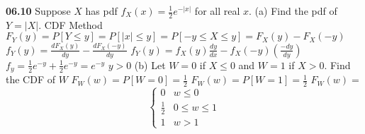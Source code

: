 {\bf 06.10}
Suppose $X$ has pdf $f_X(x)=\frac{1}{2}e^{-\left|x\right|}$ for all real $x$.
\newline
\newline (a) Find the pdf of $Y = \left|X\right|$.
\newline CDF Method
\newline $F_Y(y) = P[Y \leq y] = P[\left|x\right| \leq y] = P[-y \leq X \leq y] = F_X(y)-F_X(-y)$
\newline $f_Y(y) = \frac{dF_X(y)}{dy} - \frac{dF_X(-y)}{dy}$
\newline $f_Y(y) = f_X(y)\frac{dy}{dx} - f_X(-y)(\frac{-dy}{dy})$
\newline $f_y = \frac{1}{2}e^{-y} + \frac{1}{2}e^{-y} = e^{-y}$ $y>0$
\newline
\newline (b) Let $W = 0$ if $X \le 0$ and $W = 1$ if $X > 0$. Find the CDF of $W$
\newline $F_W(w) = P[W = 0] = \frac{1}{2}$
\newline $F_W(w) = P[W = 1] = \frac{1}{2}$
\newline $F_W(w) =$
\[ \begin{cases} 
      0 & w \leq 0 \\
      \frac{1}{2} & 0 \leq w \leq 1 \\
      1 & w > 1
   \end{cases}
\]
